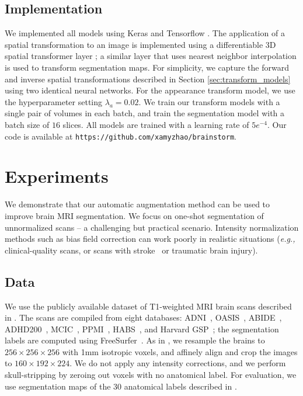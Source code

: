 \documentclass[10pt,twocolumn,letterpaper]{article}
\begin{document}
\subsection{Implementation}
We implemented all models using Keras \cite{chollet2015} and Tensorflow \cite{abadi2016}. The application of a spatial transformation to an image is implemented using a differentiable 3D spatial transformer layer \cite{balakrishnan2018unsupervised}; a similar layer that uses nearest neighbor interpolation is used to transform segmentation maps. For simplicity, we capture the forward and inverse spatial transformations described in Section \ref{sec:transform_models} using two identical neural networks. For the appearance transform model, we use the hyperparameter setting $\lambda_a=0.02$. We train our transform models with a single pair of volumes in each batch, and train the segmentation model with a batch size of $16$ slices. All models are trained with a learning rate of $5e^{-4}$. Our code is available at \texttt{https://github.com/xamyzhao/brainstorm}. \section{Experiments}\label{sec:results}
We demonstrate that our automatic augmentation method can be used to improve brain MRI segmentation. We focus on one-shot segmentation of unnormalized scans -- a challenging but practical scenario. Intensity normalization methods such as bias field correction \cite{fischl2012,sled1998nonparametric,styner2000parametric} can work poorly in realistic situations (\textit{e.g.,} clinical-quality scans, or scans with stroke~\cite{sridharan2013quantification} or traumatic brain injury). 

\subsection{Data}
We use the publicly available dataset of T1-weighted MRI brain scans described in \cite{balakrishnan2018unsupervised}. The scans are compiled from eight databases: ADNI~\cite{mueller2005ways}, OASIS~\cite{marcus2007open}, ABIDE~\cite{di2014autism}, ADHD200~\cite{milham2012adhd}, MCIC~\cite{gollub2013mcic}, PPMI~\cite{marek2011parkinson}, HABS~\cite{dagley2017harvard}, and Harvard GSP~\cite{holmes2015brain}; the segmentation labels are computed using FreeSurfer~\cite{fischl2012}. As in \cite{balakrishnan2018unsupervised}, we resample the brains to $256\times 256 \times 256$ with 1mm isotropic voxels, and affinely align and crop the images to $160 \times 192 \times 224$. We do not apply any intensity corrections, and we perform skull-stripping by zeroing out voxels with no anatomical label. For evaluation, we use segmentation maps of the $30$ anatomical labels described in \cite{balakrishnan2018unsupervised}. 
\end{document}
